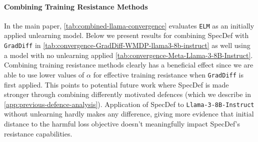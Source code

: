 \documentclass{article}
\theoremstyle{plain}
\theoremstyle{definition}
\theoremstyle{remark}
\begin{document}
\paragraph{Combining Training Resistance Methods} In the main paper, \cref{tab:combined-llama-convergence} evaluates \texttt{ELM} as an initially applied unlearning model. Below we present results for combining SpecDef with \texttt{GradDiff} in \cref{tab:convergence-GradDiff-WMDP-llama3-8b-instruct} as well using a model with no unlearning applied \cref{tab:convergence-Meta-Llama-3-8B-Instruct}. Combining training resistance methods clearly has a beneficial effect since we are able to use lower values of $\alpha$ for effective training resistance when \texttt{GradDiff} is first applied. This points to potential future work where SpecDef is made stronger through combining differently motivated defences (which we describe in \cref{app:previous-defence-analysis}). Application of SpecDef to \texttt{Llama-3-8B-Instruct} without unlearning hardly makes any difference, giving more evidence that initial distance to the harmful loss objective doesn't meaningfully impact SpecDef's resistance capabilities.
\end{document}
